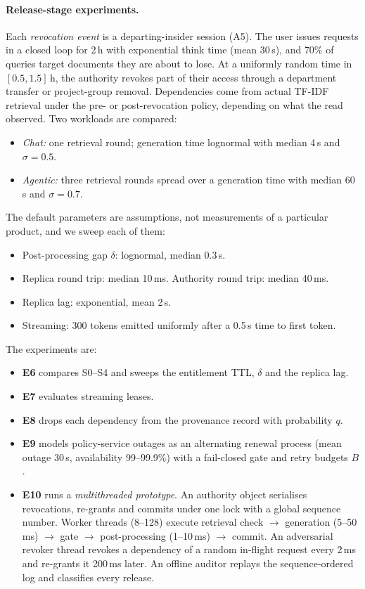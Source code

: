 \documentclass[10pt]{article}
\begin{document}
\paragraph{Release-stage experiments.}
Each \emph{revocation event} is a departing-insider session (A5). The user issues requests in a closed loop for 2\,h with exponential think time (mean 30\,s), and 70\% of queries target documents they are about to lose. At a uniformly random time in $[0.5, 1.5]$\,h, the authority revokes part of their access through a department transfer or project-group removal. Dependencies come from actual TF-IDF retrieval under the pre- or post-revocation policy, depending on what the read observed. Two workloads are compared:
\begin{itemize}\itemsep0pt
\item \emph{Chat:} one retrieval round; generation time lognormal with median 4\,s and $\sigma{=}0.5$.
\item \emph{Agentic:} three retrieval rounds spread over a generation time with median 60\,s and $\sigma{=}0.7$.
\end{itemize}
The default parameters are assumptions, not measurements of a particular product, and we sweep each of them:
\begin{itemize}\itemsep0pt
\item Post-processing gap $\delta$: lognormal, median 0.3\,s.
\item Replica round trip: median 10\,ms. Authority round trip: median 40\,ms.
\item Replica lag: exponential, mean 2\,s.
\item Streaming: 300 tokens emitted uniformly after a 0.5\,s time to first token.
\end{itemize}
The experiments are:
\begin{itemize}\itemsep0pt
\item \textbf{E6} compares S0--S4 and sweeps the entitlement TTL, $\delta$ and the replica lag.
\item \textbf{E7} evaluates streaming leases.
\item \textbf{E8} drops each dependency from the provenance record with probability $q$.
\item \textbf{E9} models policy-service outages as an alternating renewal process (mean outage 30\,s, availability 99--99.9\%) with a fail-closed gate and retry budgets $B$.
\item \textbf{E10} runs a \emph{multithreaded prototype}. An authority object serialises revocations, re-grants and commits under one lock with a global sequence number. Worker threads (8--128) execute retrieval check $\to$ generation (5--50\,ms) $\to$ gate $\to$ post-processing (1--10\,ms) $\to$ commit. An adversarial revoker thread revokes a dependency of a random in-flight request every 2\,ms and re-grants it 200\,ms later. An offline auditor replays the sequence-ordered log and classifies every release.
\end{itemize}
\end{document}
